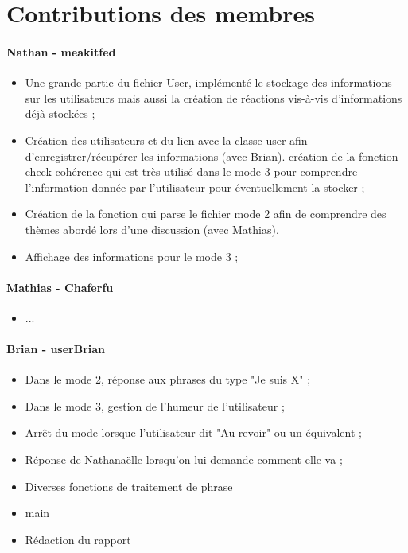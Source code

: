 \documentclass[paper=a4, fontsize=11pt]{article}
\begin{document}
\vspace{0.5cm}

\section{Contributions des membres}

\paragraph{Nathan - meakitfed}
\begin{itemize}
\item Une grande partie du fichier User, implémenté le stockage des informations sur les utilisateurs mais aussi la création de réactions vis-à-vis d'informations déjà stockées ;
\item Création des utilisateurs et du lien avec la classe user afin d’enregistrer/récupérer les informations (avec Brian).
création de la fonction check cohérence qui est très utilisé dans le mode 3 pour comprendre l’information donnée par l’utilisateur pour éventuellement la stocker ;
\item Création de la fonction qui parse le fichier mode 2 afin de comprendre des thèmes abordé lors d’une discussion (avec Mathias).
\item Affichage des informations pour le mode 3 ;
\end{itemize}

\paragraph{Mathias - Chaferfu} 
\begin{itemize}
\item ...
\end{itemize}

\paragraph{Brian - userBrian} 
\begin{itemize}
\item Dans le mode 2, réponse aux phrases du type "Je suis X" ;
\item Dans le mode 3, gestion de l'humeur de l'utilisateur ;
\item Arrêt du mode lorsque l'utilisateur dit "Au revoir" ou un équivalent ;
\item Réponse de Nathanaëlle lorsqu'on lui demande comment elle va ;
\item Diverses fonctions de traitement de phrase
\item main
\item Rédaction du rapport
\end{itemize}
\end{document}
